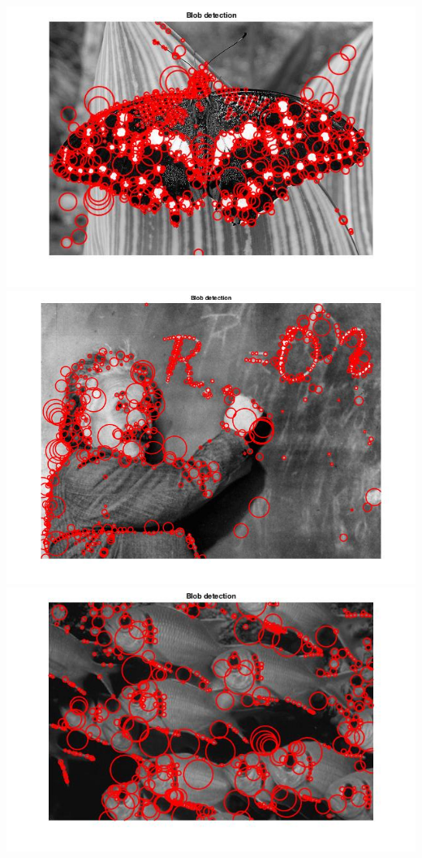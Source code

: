 \documentclass[fleqn]{article}
\begin{document}
\begin{center}
\includegraphics[width=1\textwidth]{butterfly.jpg}
\newline
\includegraphics[width=1.2\textwidth]{einstein.jpg}
\newline
\includegraphics[width=1.2\textwidth]{fishes.jpg}
\end{center}
\end{document}
